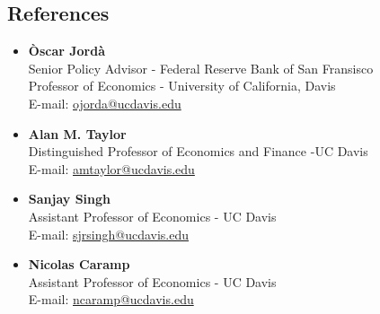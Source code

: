 \documentclass{res}
\begin{document}
\begin{normalsize}
\section{References}
\begin{itemize}

\item \textbf{Òscar Jordà}\\
Senior Policy Advisor - Federal Reserve Bank of San Fransisco\\
Professor of Economics - University of California, Davis\\
E-mail: \href{mailto:ojorda@ucdavis.edu}{ojorda@ucdavis.edu}
\item \textbf{Alan M. Taylor}\\
Distinguished Professor of Economics and Finance -UC Davis\\
E-mail: \href{mailto:amtaylor@ucdavis.edu}{amtaylor@ucdavis.edu}
\item \textbf{Sanjay Singh}\\
Assistant Professor of Economics - UC Davis\\
E-mail: \href{mailto:sjrsingh@ucdavis.edu}{sjrsingh@ucdavis.edu}
\item \textbf{Nicolas Caramp}\\
Assistant Professor of Economics - UC Davis\\
E-mail: \href{mailto:ncaramp@ucdavis.edu}{ncaramp@ucdavis.edu}

\end{itemize}
\end{normalsize}
\end{document}
